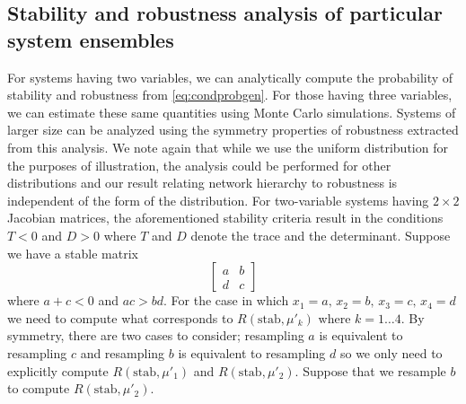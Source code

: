 \subsection{Stability and robustness analysis of particular system ensembles}
For systems having two variables, we can analytically compute the probability of stability and robustness from \ref{eq:condprobgen}. For those having three variables, we can estimate these same quantities using Monte Carlo simulations. Systems of larger size can be analyzed using the symmetry properties of robustness extracted from this analysis. We note again that while we use the uniform distribution for the purposes of illustration, the analysis could be performed for other distributions and our result relating network hierarchy to robustness is independent of the form of the distribution. For two-variable systems having $2 \times 2$ Jacobian matrices, the aforementioned stability criteria result in the conditions $T < 0$ and $D >
0$ where $T$ and $D$ denote the trace and the determinant. Suppose we have a stable matrix
$$
\begin{bmatrix}
a & b \\
d & c
\end{bmatrix}
$$
where $a + c < 0$ and $ac > bd$.  For the case in which $x_1=a,\,x_2=b,\,x_3=c,\,x_4=d$ we need to compute what corresponds to $R(\mathrm{stab},\mu'_k)$ where $k=1 \ldots 4$. By symmetry, there are two cases to consider; resampling $a$ is equivalent to resampling $c$ and resampling $b$ is equivalent to resampling $d$ so we only need to explicitly compute $ R(\mathrm{stab},\mu'_1)$ and $R(\mathrm{stab},\mu'_2)$. Suppose that we resample $b$ to compute $R(\mathrm{stab},\mu'_2)$.
